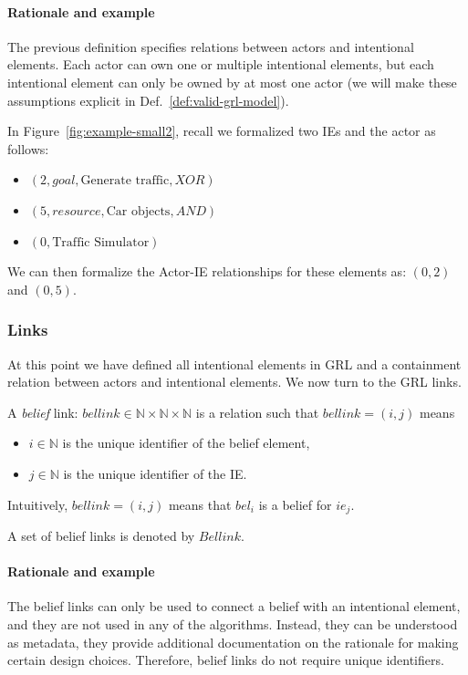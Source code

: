 \paragraph{Rationale and example} The previous definition specifies relations between actors and intentional elements. Each actor can own one or multiple intentional elements, but each intentional element can only be owned by at most one actor (we will make these assumptions explicit in Def.~\ref{def:valid-grl-model}).

In Figure~\ref{fig:example-small2}, recall we formalized two IEs and the actor as follows:
\begin{itemize}
\item $(2, goal, \text{Generate traffic}, XOR)$
\item $(5, resource, \text{Car objects}, AND)$
\item $(0, \text{Traffic Simulator})$
\end{itemize}

We can then formalize the Actor-IE relationships for these elements as: $(0,2)$ and $(0,5)$.

\subsubsection{Links}

At this point we have defined all intentional elements in GRL and a containment relation between actors and intentional elements. We now turn to the GRL links.

\begin{definition}
\label{def:link:belief}
A \emph{belief} link: $bellink\in \mathbb{N}\times\mathbb{N}\times\mathbb{N}$ is a relation such that $bellink = (i,j)$ means
\begin{itemize}
\item $i\in \mathbb{N}$ is the unique identifier of the belief element,
\item $j\in \mathbb{N}$ is the unique identifier of the IE.
\end{itemize}
Intuitively, $bellink = (i,j)$ means that $bel_i$ is a belief for $ie_j$.

A set of belief links is denoted by $Bellink$.
\end{definition}

\paragraph{Rationale and example} The belief links can only be used to connect a belief with an intentional element, and they are not used in any of the algorithms. Instead, they can be understood as metadata, they provide additional documentation on the rationale for making certain design choices. Therefore, belief links do not require unique identifiers.

